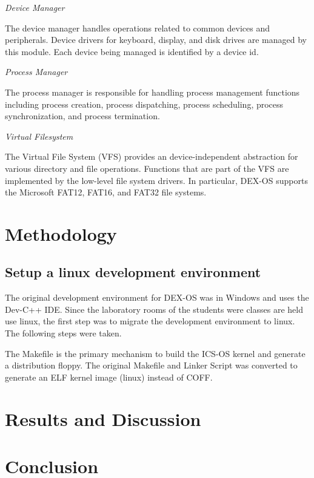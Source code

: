 \documentclass{acm_proc_article-sp}
\begin{document}
\textit{Device Manager}

The device manager handles operations related to common devices and peripherals.
Device drivers for keyboard, display, and disk drives are managed by this 
module. Each device being managed is identified by a device id. 

\textit{Process Manager}

The process manager is responsible for handling process management functions
including process creation, process dispatching, process scheduling, process
synchronization, and process termination. 

\textit{Virtual Filesystem}

The Virtual File System (VFS) provides an device-independent abstraction for
various directory and file operations. Functions that are part of the VFS are
implemented by the low-level file system drivers. In particular, DEX-OS 
supports the Microsoft FAT12, FAT16, and FAT32 file systems.

\section{Methodology}

\subsection{Setup a linux development environment}
The original development environment for DEX-OS was in Windows and uses the 
Dev-C++ IDE. Since the laboratory rooms of the students were classes are held
use linux, the first step was to migrate the development environment to 
linux. The following steps were taken.

The Makefile is the primary mechanism to build the ICS-OS kernel and 
generate a distribution floppy. The original Makefile and Linker Script
was converted to generate an ELF kernel image (linux) instead of COFF.


\section{Results and Discussion}

\section{Conclusion}



\balancecolumns
\end{document}

